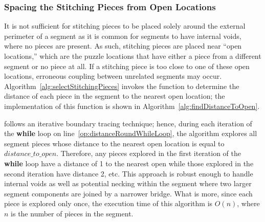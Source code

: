 \subsubsection{Spacing the Stitching Pieces from Open Locations}\label{sec:determiningSpacingToNearestOpenLocation}

It is not sufficient for stitching pieces to be placed solely around the external perimeter of a segment as it is common for segments to have internal voids, where no pieces are present.  As such, stitching pieces are placed near ``open locations,'' which are the puzzle locations that have either a piece from a different segment or no piece at all. If a stitching piece is too close to one of these open locations, erroneous coupling between unrelated segments may occur.  Algorithm~\ref{alg:selectStitchingPieces} invokes the function  to determine the distance of each piece in the segment to the nearest open location; the implementation of this function is shown in Algorithm~\ref{alg:findDistanceToOpen}.  

 follows an iterative boundary tracing technique; hence, during each iteration of the \textbf{while} loop on line~\ref{op:distanceRoundWhileLoop}, the algorithm explores all segment pieces whose distance to the nearest open location is equal to $distance\_to\_open$.  Therefore, any pieces explored in the first iteration of the \textbf{while} loop have a distance of 1 to the nearest open while those explored in the second iteration have distance 2, etc. This approach is robust enough to handle internal voids as well as potential necking within the segment where two larger segment components are joined by a narrower bridge. What is more, since each piece is explored only once, the execution time of this algorithm is $O(n)$, where $n$ is the number of pieces in the segment.

